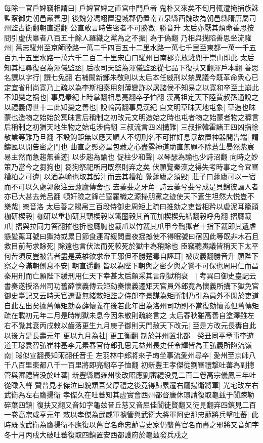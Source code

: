 每除一官戶婢竊相謂曰|{
	戶婢官婢之直宫中門戶者}
鬼朴又來矣不旬月輒遭掩捕族誅監察御史朝邑嚴善思|{
	後魏分馮翊置澄城郡仍置南五泉縣西魏改為朝邑縣隋唐屬司州監古衘翻朝直遥翻}
公直敢言時告密者不可勝數|{
	勝音升}
太后亦厭其煩命善思按問引虚伏辠者八百五十餘人羅織之黨為之不振|{
	為于偽翻}
乃相與搆陷善思坐流驩州|{
	舊志驩州至京師陸路一萬二千四百五十二里水路一萬七千里至東都一萬一千五百九十五里水路一萬六千二百二十里宋白曰驩州日南郡堯放驩兜于崇山即此}
太后知其枉尋復召為渾儀監丞|{
	后改司天監為渾儀監丞從七品下復扶又翻渾戶本翻}
善思名譔以字行|{
	譔七免翻}
右補闕新鄭朱敬則以太后本任威刑以禁異議今既革命衆心已定宜省刑尚寛乃上疏以為李斯相秦用刻薄變詐以屠諸侯不知易之以寛和卒至土崩此不知變之祸也|{
	事見秦紀上時掌翻相息亮翻卒子恤翻}
漢高祖定天下陸賈叔孫通說之以禮義傳世十二此知變之善也|{
	說輪芮翻事見漢紀}
自文明草昧天地屯象|{
	草造也昧蒙也造物之始始於冥昧言后稱制之初改元文明造始之時也屯者物之始蒙者物之稺言后稱制之初猶天地生物之始屯涉倫翻}
三叔流言四凶搆難|{
	三叔指韓霍諸王四凶指徐敬業等難乃旦翻}
不設鉤距無以應天順人不切刑名不可摧奸息暴故置神器開告端|{
	謂鑄匭以開告密之門也}
曲直之影必呈包藏之心盡露神道助直無罪不除蒼生晏然紫宸易主然而急趨無善迹|{
	以步趨為諭也}
促柱少和聲|{
	以琴瑟為諭也少詩沼翻}
向時之妙策乃當今之芻狗也|{
	芻狗祭祀所用既祭則弃之矣}
伏願覽秦漢之得失考時事之合宜審糟粕之可遺|{
	以酒為喻也取其醇汁而去其糟粕}
覺蘧廬之須毁|{
	莊子曰蘧廬可以一宿而不可以久處郭象注云蘧廬傳舍也}
去萋斐之牙角|{
	詩云萋兮斐兮成是貝錦彼譛人者亦已大甚去羌呂翻}
頓奸險之鋒芒窒羅織之源掃朋黨之迹使天下蒼生坦然大悦豈不樂哉|{
	樂音洛}
太后善之賜帛三百段侍御史周矩上疏曰推劾之吏皆相矜以虐泥耳籠頭枷研楔轂|{
	枷研以重枷研其頸楔轂以鐵圈轂其首而加楔楔先結翻轂呼角翻}
摺膺籖爪|{
	摺與拉同力答翻摧也折也膺胸也籖爪以竹籖其爪甲今鞫獄者十指下籖即其遺虐}
懸髪薰耳號曰獄持或累日節食連宵緩問晝夜揺撼使不得眠號曰宿囚此等既非木石且救目前苟求賖死|{
	賖遠也言伏法而死較死於獄中為稍賖也}
臣竊聽輿議皆稱天下太平何苦須反豈被告者盡是英䧺欲求帝王邪但不勝楚毒自誣耳|{
	被皮義翻勝音升}
願陛下察之今滿朝側息不安|{
	朝直遥翻}
皆以為陛下朝與之密夕與之讐不可保也周用仁而昌秦用刑而亡願陛下緩刑用仁天下幸甚太后頗采其言制獄稍衰　|{
	考異曰御史臺記云書奏遂授洛州司功舊薛懷義傳云矩劾奏懷義遷矩天官員外郎竟為懷義所搆下獄免官御史臺記又云時天官選曹無緒敕矩監之侍郎李景謀為矩所制乃引為員外不閑於吏道自此左出矣據舊傳矩劾奏薛懷義在後若此年出為洛州司功則不當復劾懷義但舊傳矩疏在載初元年二月是時制獄未息今因朱敬則疏終言之}
太后春秋雖高善自塗澤雖左右不覺其衰丙戌敕以齒落更生九月庚子御則天門赦天下改元|{
	至是方改元長夀自此以後方是長壽元年}
更以九月為社|{
	更工衡翻}
制於并州置北都　癸丑同平章事李遊道王璿袁智弘崔神基李元素春官侍郎孔思元益州長史任令輝皆為王弘義所陷流嶺南|{
	璿似宣翻長知兩翻任音壬}
左羽林中郎將來子珣坐事流愛州尋卒|{
	愛州至京師八千八百里東都八千一百里將即亮翻卒子恤翻}
初新豐王孝傑從劉審禮撃吐蕃為副摠管與審禮皆没於吐蕃|{
	新豐縣屬雍州後改昭應劉審禮没見二百二卷高宗儀鳳三年吐從瞰入聲}
贊普見孝傑泣曰貌類吾父厚禮之後竟得歸累遷右鷹揚衛將軍|{
	光宅改左右武衛為左右鷹揚衛}
孝傑久在吐蕃知其虚實會西州都督唐休璟請復取龜兹于闐踈勒碎葉四鎮|{
	復扶又翻又音如字龜兹音丘慈又音屈佳闐徒賢翻又徒見翻弃四鎮見二百一卷高宗咸亨元年}
敕以孝傑為武威軍摠管與武衛大將軍阿史那忠蓈將兵撃吐蕃|{
	此時既改武衛為鷹揚衛不應復以舊官名命忠蓈豈史家仍襲舊官名而書之邪將又音如字}
冬十月丙戍大破吐蕃復取四鎮置安西都護府於龜兹發兵戍之

